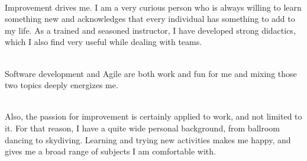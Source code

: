 \documentclass[a4paper, 10pt, onecolumn, oneside]{report}
\begin{document}
\\Improvement drives me. I am a very curious person who is always willing to learn something new and acknowledges that every individual has something to add to my life. As a trained and seasoned instructor, I have developed strong didactics, which I also find very useful while dealing with teams.

\\Software development and Agile are both work and fun for me and mixing those two topics deeply energizes me.

\\Also, the passion for improvement is certainly applied to work, and not limited to it. For that reason, I have a quite wide personal background, from ballroom dancing to skydiving. Learning and trying new activities makes me happy, and gives me a broad range of subjects I am comfortable with. 
\end{document}
